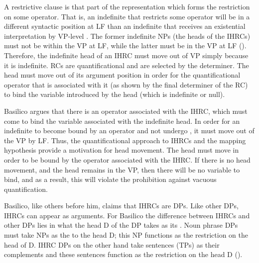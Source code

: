 \documentclass[output=paper]{LSP/langsci}
\begin{document}
A restrictive clause is that part of the representation which forms the restriction on some operator. That is, an indefinite that restricts some operator will be in a different syntactic position at LF than an indefinite that receives an existential interpretation by VP-level . The former indefinite NPs (the heads of the IHRCs) must not be within the VP at LF, while the latter must be in the VP at LF (\citealt{Basilico1996}). Therefore, the indefinite head of an IHRC must move out of VP simply because it is indefinite. RCs are quantificational and are selected by the determiner. The head must move out of its argument position in order for the quantificational operator that is associated with it (as shown by the final determiner of the RC) to bind the variable introduced by the head (which is indefinite or null).   
	
Basilico argues that there is an operator associated with the IHRC, which must come to bind the variable associated with the indefinite head. In order for an indefinite to become bound by an operator and not undergo , it must move out of the VP by LF. Thus, the quantificational approach to IHRCs and the mapping hypothesis provide a motivation for head movement. The head must move in order to be bound by the operator associated with the IHRC. If there is no head movement, and the head remains in the VP, then there will be no variable to bind, and as a result, this will violate the prohibition against vacuous quantification.  
	
Basilico, like others before him, claims that IHRCs are DPs. Like other DPs, IHRCs can appear as arguments. For Basilico the difference between IHRCs and other DPs lies in what the head D of the DP takes as its . Noun phrase DPs must take NPs as the  to the head D; this NP functions as the restriction on the head of D. IHRC DPs on the other hand take sentences (TPs) as their complements and these sentences function as the restriction on the head D (\citealt{Basilico1996}). 
	
\end{document}
